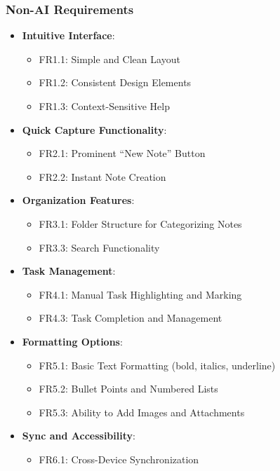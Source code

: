\documentclass[a4paper, 12pt]{article}
\begin{document}
\subsubsection{Non-AI Requirements}
\begin{itemize}
    \item \textbf{Intuitive Interface}:
    \begin{itemize}
        \item FR1.1: Simple and Clean Layout
        \item FR1.2: Consistent Design Elements
        \item FR1.3: Context-Sensitive Help
    \end{itemize}
    \item \textbf{Quick Capture Functionality}:
    \begin{itemize}
        \item FR2.1: Prominent “New Note” Button
        \item FR2.2: Instant Note Creation
    \end{itemize}
    \item \textbf{Organization Features}:
    \begin{itemize}
        \item FR3.1: Folder Structure for Categorizing Notes
        \item FR3.3: Search Functionality
    \end{itemize}
    \item \textbf{Task Management}:
    \begin{itemize}
        \item FR4.1: Manual Task Highlighting and Marking
        \item FR4.3: Task Completion and Management
    \end{itemize}
    \item \textbf{Formatting Options}:
    \begin{itemize}
        \item FR5.1: Basic Text Formatting (bold, italics, underline)
        \item FR5.2: Bullet Points and Numbered Lists
        \item FR5.3: Ability to Add Images and Attachments
    \end{itemize}
    \item \textbf{Sync and Accessibility}:
    \begin{itemize}
        \item FR6.1: Cross-Device Synchronization
    \end{itemize}
\end{itemize}
\end{document}
